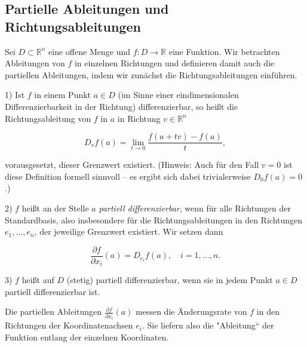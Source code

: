 \subsection{Partielle Ableitungen und Richtungsableitungen}

Sei $ D \subset \mathbb{R}^n $ eine offene Menge und $ f: D \to \mathbb{R} $ eine Funktion. Wir betrachten Ableitungen von $ f $ in einzelnen Richtungen und definieren damit auch die partiellen Ableitungen, indem wir zunächst die Richtungsableitungen einführen.

\begin{definition}{}
1) Ist $ f $ in einem Punkt $ a \in D $ (im Sinne einer eindimensionalen Differenzierbarkeit in der Richtung) differenzierbar, so heißt die Richtungsableitung von $ f $ in $ a $ in Richtung $ v \in \mathbb{R}^n $


$$
D_v f(a) = \lim_{t\to 0} \frac{f(a+tv)-f(a)}{t},
$$


vorausgesetzt, dieser Grenzwert existiert. (Hinweis: Auch für den Fall $ v=0 $ ist diese Definition formell sinnvoll – es ergibt sich dabei trivialerweise $ D_{0}f(a)=0 $.)


2) $ f $ heißt an der Stelle $ a $ \emph{partiell differenzierbar}, wenn für alle Richtungen der Standardbasis, also insbesondere für die Richtungsableitungen in den Richtungen $ e_1,\dots,e_n $, der jeweilige Grenzwert existiert. Wir setzen dann


$$
\frac{\partial f}{\partial x_i}(a) = D_{e_i} f(a), \quad i=1,\dots,n.
$$


3) $ f $ heißt auf $ D $ (stetig) partiell differenzierbar, wenn sie in jedem Punkt $ a \in D $ partiell differenzierbar ist.
\end{definition}

\begin{bemerkungbox}
    Die partiellen Ableitungen $\frac{\partial f}{\partial x_i}(a)$ messen die Änderungsrate von $ f $ in den Richtungen der Koordinatenachsen $ e_i $. Sie liefern also die "Ableitung“ der Funktion entlang der einzelnen Koordinaten.
\end{bemerkungbox}

